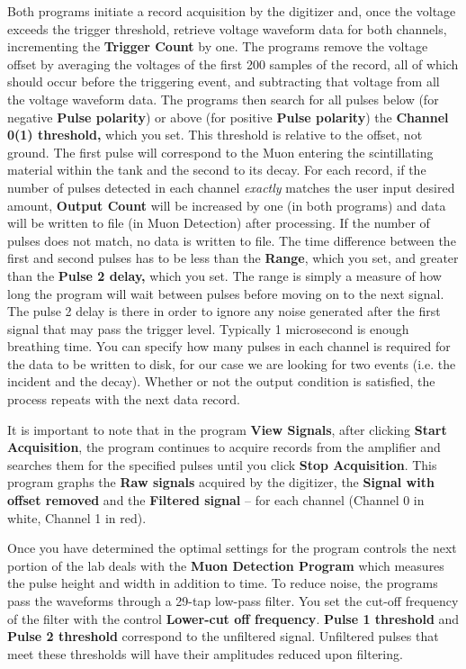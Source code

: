 \documentclass{../lab}
\begin{document}
Both programs initiate a record acquisition by the digitizer and, once the voltage exceeds the trigger threshold, retrieve voltage waveform data for both channels, incrementing the \textbf{Trigger Count} by one. The programs remove the voltage offset by averaging the voltages of the first 200 samples of the record, all of which should occur before the triggering event, and subtracting that voltage from all the voltage waveform data. The programs then search for all pulses below (for negative \textbf{Pulse polarity}) or above (for positive \textbf{Pulse polarity}) the \textbf{Channel 0(1) threshold,} which you set. This threshold is relative to the offset, not ground. The first pulse will correspond to the Muon entering the scintillating material within the tank and the second to its decay. For each record, if the number of pulses detected in each channel \textit{exactly} matches the user input desired amount, \textbf{Output Count} will be increased by one (in both programs) and data will be written to file (in Muon Detection) after processing. If the number of pulses does not match, no data is written to file. The time difference between the first and second pulses has to be less than the \textbf{Range}, which you set, and greater than the \textbf{Pulse 2 delay,} which you set. The range is simply a measure of how long the program will wait between pulses before moving on to the next signal. The pulse 2 delay is there in order to ignore any noise generated after the first signal that may pass the trigger level. Typically 1 microsecond is enough breathing time. You can specify how many pulses in each channel is required for the data to be written to disk, for our case we are looking for two events (i.e. the incident and the decay). Whether or not the output condition is satisfied, the process repeats with the next data record.

It is important to note that in the program \textbf{View Signals}, after clicking \textbf{Start Acquisition}, the program continues to acquire records from the amplifier and searches them for the specified pulses until you click \textbf{Stop Acquisition}. This program graphs the \textbf{Raw signals} acquired by the digitizer, the \textbf{Signal with offset removed} and the \textbf{Filtered signal} -- for each channel (Channel 0 in white, Channel 1 in red).

Once you have determined the optimal settings for the program controls the next portion of the lab deals with the\textbf{ Muon Detection Program }which measures the pulse height and width in addition to time. To reduce noise, the programs pass the waveforms through a 29-tap low-pass filter. You set the cut-off frequency of the filter with the control \textbf{Lower-cut off frequency}. \textbf{Pulse 1 threshold} and \textbf{Pulse 2 threshold} correspond to the unfiltered signal. Unfiltered pulses that meet these thresholds will have their amplitudes reduced upon filtering.
\end{document}
